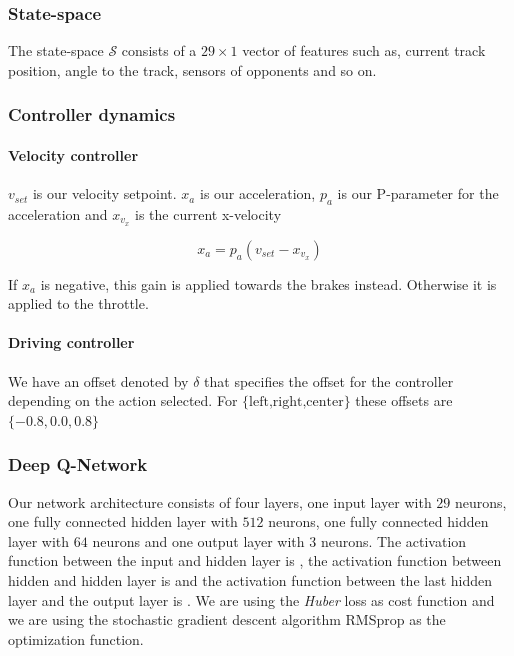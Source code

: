\documentclass{article}
\begin{document}
\subsubsection{State-space}
The state-space $\mathcal{S}$ consists of a $29\times1$ vector of features such as, current track position, angle to the track, sensors of opponents and so on.

\subsubsection{Controller dynamics}

\paragraph{Velocity controller}

$v_{set}$ is our velocity setpoint. $x_a$ is our acceleration, $p_a$ is our P-parameter for the acceleration and $x_{v_x}$ is the current x-velocity

\[
	x_a = p_a (v_{set} - x_{v_x})
\]

If $x_a$ is negative, this gain is applied towards the brakes instead. Otherwise it is applied to the throttle.

\paragraph{Driving controller}

We have an offset denoted by $\delta$ that specifies the offset for the controller depending on the action selected. For ${\text{\{left,right,center}\}}$ these offsets are $\{-0.8, 0.0, 0.8\}$

\subsubsection{Deep Q-Network}

Our network architecture consists of four layers, one input layer with $29$ neurons, one fully connected hidden layer with $512$ neurons, one fully connected hidden layer with $64$ neurons and one output layer with $3$ neurons. The activation function between the input and hidden layer is , the activation function between hidden and hidden layer is  and the activation function between the last hidden layer and the output layer is .
We are using the \textit{Huber} loss as cost function and we are using the stochastic gradient descent algorithm RMSprop as the optimization function.
\end{document}

